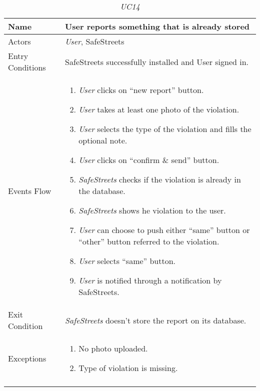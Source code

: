 \documentclass[../../../RASD.tex]{subfiles}
\begin{document}
    \begin{center}
    \begin{longtable}{| p{.35\linewidth} | p{.65\linewidth} |}
    \hline
    \textbf{Name} & \textbf{User reports something that is already stored}\\ \hline
    Actors & \textit{User}, SafeStreets\\ \hline
    Entry Conditions & SafeStreets successfully installed and User signed in.\\ \hline
    Events Flow &
    \begin{enumerate}
    \item \textit{User} clicks on “new report” button.
    \item \textit{User} takes at least one photo of the violation.
    \item \textit{User} selects the type of the violation and fills the optional note.
    \item \textit{User} clicks on “confirm \& send” button.
    \item \textit{ SafeStreets} checks if the violation is already in the database.
    \item \textit{SafeStreets} shows he violation to the user.
        \item \textit{User} can choose to push either “same” button or “other” button referred to the violation.
        \item \textit{User} selects “same” button.
        \item \textit{User} is notified through a notification by SafeStreets.
    \end{enumerate}
    \\ \hline
    Exit Condition & \textit{SafeStreets} doesn't store the report on its database.\\ \hline
    Exceptions &
    \begin{enumerate}
    \item No photo uploaded.
        \item Type of violation is missing.
    \end{enumerate}
    \\
    \hline
    \caption[\textit{Use Case 14}]{\textit{UC14}}
    \end{longtable}
    \end{center}
\end{document}
